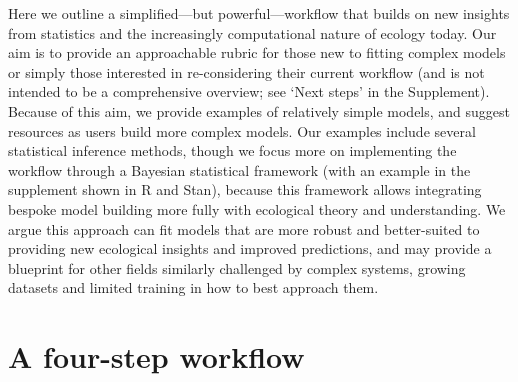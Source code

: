 \documentclass[11pt]{article}
\begin{document}
Here we outline a simplified---but powerful---workflow that builds on new insights from statistics  \citep{betanworkflow,vandeschoot2021} and the increasingly computational nature of ecology today. Our aim is to provide an approachable rubric for those new to fitting complex models or simply those interested in re-considering their current workflow (and is not intended to be a comprehensive overview; see `Next steps' in the Supplement). Because of this aim, we provide examples of relatively simple models, and suggest resources as users build more complex models. Our examples include several statistical inference methods, though we focus more on implementing the workflow through a Bayesian statistical framework (with an example in the supplement shown in \textsf{R} and \textsf{Stan}), because this framework allows integrating bespoke model building more fully with ecological theory and understanding. We argue this approach can fit models that are more robust and better-suited to providing new ecological insights and improved predictions, and may provide a blueprint for other fields similarly challenged by complex systems, growing datasets and limited training in how to best approach them. 


\section*{A four-step workflow}
\end{document}

